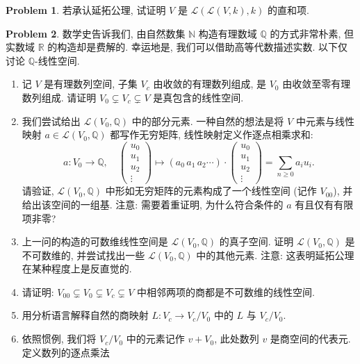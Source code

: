 \documentclass{MainStyle}
\theoremstyle{definition}
\newtheorem{problem}{Problem}
\begin{document}
\begin{problem}
若承认延拓公理, 试证明 $V$ 是 $\mathcal L(\mathcal L(V,k),k)$ 的直和项.
\end{problem}

\begin{problem}
数学史告诉我们, 由自然数集 $\mathbb N$ 构造有理数域 $\mathbb Q$ 的方式非常朴素, 但实数域 $\mathbb R$ 的构造却是费解的. 幸运地是, 我们可以借助高等代数描述实数. 以下仅讨论 $\mathbb Q$-线性空间.
\begin{enumerate}
    \item 记 $V$ 是有理数列空间, 子集 $V_c$ 由收敛的有理数列组成, 是 $V_0$ 由收敛至零有理数列组成. 请证明 $V_0\subsetneq V_c\subsetneq V$ 是真包含的线性空间.
    \item 我们尝试给出 $\mathcal L(V_0,\mathbb Q)$ 中的部分元素. 一种自然的想法是将 $V$ 中元素与线性映射 $a\in \mathcal L(V_0,\mathbb Q)$ 都写作无穷矩阵, 线性映射定义作逐点相乘求和:
          \begin{equation}
              a:V_0\to \mathbb Q,\quad \begin{pmatrix}u_0\\u_1\\u_2\\\vdots\end{pmatrix}\mapsto (a_0\,a_1\,a_2\cdots )\cdot \begin{pmatrix}u_0\\u_1\\u_2\\\vdots\end{pmatrix}=\sum_{n\geq 0}a_iu_i.
          \end{equation}
          请验证, $\mathcal L(V_0,\mathbb Q)$ 中形如无穷矩阵的元素构成了一个线性空间 (记作 $V_{00}$), 并给出该空间的一组基. 注意: 需要着重证明, 为什么符合条件的 $a$ 有且仅有有限项非零?
    \item 上一问的构造的可数维线性空间是 $\mathcal L(V_0,\mathbb Q)$ 的真子空间. 证明 $\mathcal L(V_0,\mathbb Q)$ 是不可数维的, 并尝试找出一些 $\mathcal L(V_0,\mathbb Q)$ 中的其他元素. 注意: 这表明延拓公理在某种程度上是反直觉的.
    \item 请证明: $V_{00}\subsetneq V_0\subsetneq V_c\subsetneq V$ 中相邻两项的商都是不可数维的线性空间.
    \item 用分析语言解释自然的商映射 $L:V_c\to V_c/V_0$ 中的 $L$ 与 $V_c/V_0$.
    \item 依照惯例, 我们将 $V_c/V_0$ 中的元素记作 $v+V_0$, 此处数列 $v$ 是商空间的代表元. 定义数列的逐点乘法
          \begin{equation}

\end{equation}
\end{enumerate}
\end{problem}
\end{document}
